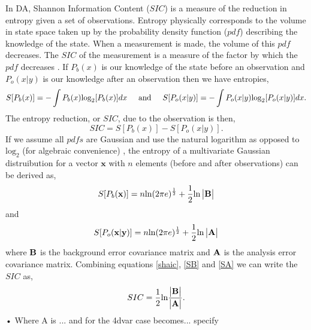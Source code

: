 \documentclass[11pt]{article}
\begin{document}
In DA, Shannon Information Content ($SIC$) is a measure of the reduction in entropy given a set of observations. Entropy physically corresponds to the volume in state space taken up by the probability density function ($pdf$) describing the knowledge of the state. When a measurement is made, the volume of this $pdf$ decreases. The $SIC$ of the measurement is a measure of the factor by which the $pdf$ decreases \citep{rodgers2000inverse}. If $P_b(x)$ is our knowledge of the state before an observation and $P_o(x|y)$ is our knowledge after an observation then we have entropies,
\[
S[P_b(x)] = - \int P_b(x)\text{log}_2[P_b(x)]dx
 \hspace{5mm} \text{and} \hspace{5mm} 
S[P_o(x|y)] = - \int P_o(x|y)\text{log}_2[P_o(x|y)]dx.
\]
The entropy reduction, or $SIC$, due to the observation is then,
\begin{equation} \label{shaic}
SIC =  S[P_b(x)]-S[P_o(x|y)].
\end{equation}
If we assume all $pdfs$ are Gaussian and use the natural logarithm as opposed to $\text{log}_2$ (for algebraic convenience) \cite{rodgers2000inverse}, the entropy of a multivariate Gaussian distruibution for a vector $\textbf{x}$ with $n$ elements (before and after observations) can be derived as,
\begin{equation} \label{SB}
 S[P_b(\textbf{x})] = n\text{ln}(2\pi e)^{\frac{1}{2}}+\frac{1}{2}\text{ln}\begin{vmatrix}\bf{B}\end{vmatrix}
\end{equation}
and
\begin{equation} \label{SA}
 S[P_o(\textbf{x}|\textbf{y})] = n\text{ln}(2\pi e)^{\frac{1}{2}}+\frac{1}{2}\text{ln}\begin{vmatrix}\bf{A}\end{vmatrix}
\end{equation}
where $\bf{B}$ is the background error covariance matrix and $\bf{A}$ is the analysis error covariance matrix. Combining equations \ref{shaic}, \ref{SB} and \ref{SA} we can write the $SIC$ as,
\begin{equation}
SIC=\frac{1}{2}\text{ln}\frac{\begin{vmatrix} \bf{B} \end{vmatrix}}{\begin{vmatrix} \bf{A} \end{vmatrix}}.
\end{equation}•
{\color{red}Where A is ... and for the 4dvar case becomes... specify}
\end{document}
